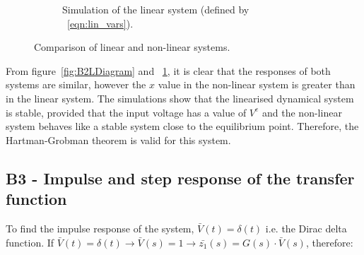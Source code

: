 \documentclass[a4paper,10pt,reqno]{amsart}
\numberwithin{equation}{section}
\begin{document}
\begin{figure}[h]
\begin{subfigure}{.5\linewidth}
    \caption{Simulation of the linear system (defined by ~\ref{eqn:lin_vars}).}
    \label{fig:B2NLDiagram}
\end{subfigure}
\caption{Comparison of linear and non-linear systems.}
\label{fig:B2Diagrams}
\end{figure}

\par From figure~\ref{fig:B2LDiagram} and ~\ref{fig:B2NLDiagram}, it is clear that the responses of both systems are similar, however the $x$ value in the non-linear system is greater than in the linear system. The simulations show that the linearised dynamical system is stable, provided that the input voltage has a value of $V^e$ and the non-linear system behaves like a stable system close to the equilibrium point. Therefore, the Hartman-Grobman theorem is valid for this system.

\subsection{B3 - Impulse and step response of the transfer function}

\par To find the impulse response of the system, $\bar{V}(t)=\delta(t)$ i.e. the Dirac delta function. If $\bar{V}(t) = \delta(t) \rightarrow \bar{V}(s)=1 \rightarrow \bar{z_1}(s)=G(s)\cdot{\bar{V}(s)}$, therefore:
\end{document}
